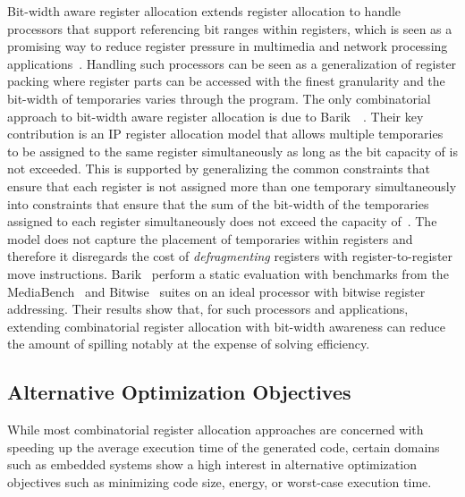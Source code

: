 \documentclass[acmsmall,authorversion,nonacm]{acmart}
\begin{document}
Bit-width aware register allocation extends register allocation to
handle processors that support referencing bit ranges within
registers, which is seen as a promising way to reduce register
pressure in multimedia and network processing
applications~\cite{Tallam2003,Nandivada2013}.
Handling such processors can be seen as a generalization of register
packing where register parts can be accessed with the finest
granularity and the bit-width of temporaries varies through the
program.
The only combinatorial approach to bit-width aware register allocation
is due to Barik~\etal{}~\cite{Barik2007}.
Their key contribution is an IP register allocation model that allows
multiple temporaries to be assigned to the same register 
simultaneously as long as the bit capacity of  is not exceeded.
This is supported by generalizing the common constraints that ensure
that each register is not assigned more than one temporary
simultaneously into constraints that ensure that the sum of the
bit-width of the temporaries assigned to each register 
simultaneously does not exceed the capacity of~.
The model does not capture the placement of temporaries within
registers and therefore it disregards the cost of \emph{defragmenting}
registers with register-to-register move instructions.
Barik~\etal{} perform a static evaluation with benchmarks from the
MediaBench~\cite{Lee1997} and Bitwise~\cite{Stephenson2000} suites on
an ideal processor with bitwise register addressing.
Their results show that, for such processors and applications,
extending combinatorial register allocation with bit-width awareness
can reduce the amount of spilling notably at the expense of
solving efficiency.

\subsection{Alternative Optimization Objectives}
\label{sec:alternative-optimization-objectives}

While most combinatorial register allocation approaches are concerned
with speeding up the average execution time of the generated code,
certain domains such as embedded systems show a high interest in
alternative optimization objectives such as minimizing code size,
energy, or worst-case execution time.
\end{document}
